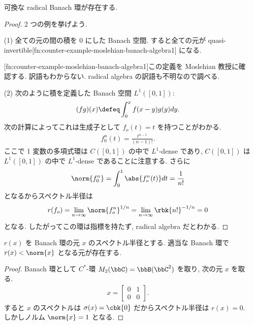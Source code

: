 \documentclass[openany, a4paper, oneside]{jsbook}
\begin{document}
\begin{ex}
可換な radical Banach 環が存在する.
\end{ex}
\begin{proof}
2 つの例を挙げよう.

(1) 全ての元の間の積を 0 にした Banach 空間.
すると全ての元が quasi-invertible[fn:counter-example-moslehian-banach-algebra1] になる.

[fn:counter-example-moslehian-banach-algebra1]この定義を Moslehian 教授に確認する.
訳語もわからない.
radical algebra の訳語も不明なので調べる.

(2) 次のように積を定義した Banach 空間 $L^1([0, 1])$:
\begin{align}
 (fg) (x)
 \defeq
 \int_0^x f(x - y) g(y) dy.
\end{align}
次の計算によってこれは生成子として $f_o (t) = t$ を持つことがわかる.
\begin{align}
 f^n_0 (t)
 =
 \frac{t^{n-1}}{(n-1)!}.
\end{align}
ここで 1 変数の多項式環は $C([0, 1])$ の中で $L^1$-dense であり,
$C([0, 1])$ は $L^1([0, 1])$ の中で $L^1$-dense であることに注意する.
さらに
\begin{align}
 \norm{f_0^n}
 =
 \int_0^1 \abs{f_o^n (t)} dt
 =
 \frac{1}{n!}
\end{align}
となるからスペクトル半径は
\begin{align}
 r(f_o)
 =
 \lim_{n \to \infty} \norm{f_o^n}^{1/n}
 =
 \lim_{n \to \infty} \rbk{n!}^{-1/n}
 = 0
\end{align}
となる.
したがってこの環は指標を持たず, radical algebra だとわかる.
\end{proof}

\begin{ex}
$r(x)$ を Banach 環の元 $x$ のスペクトル半径とする.
適当な Banach 環で $r(x) < \norm{x}$ となる元が存在する.
\end{ex}
\begin{proof}
Banach 環として $C^*$-環 $M_2 (\bbC) = \bbB(\bbC^2)$ を取り,
次の元 $x$ を取る.
\begin{align}
 x
 =
 \begin{bmatrix}
  0 & 1 \\
  0 & 0
 \end{bmatrix}.
\end{align}
すると $x$ のスペクトルは $\sigma (x) = \cbk{0}$ だからスペクトル半径は $r(x) = 0$.
しかしノルム $\norm{x} = 1$ となる.
\end{proof}
\end{document}
